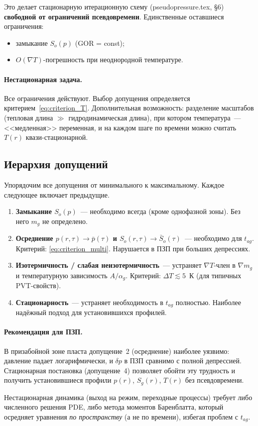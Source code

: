 \documentclass[12pt,a4paper]{article}
\begin{document}
Это делает стационарную итерационную схему
(pseudopressure.tex, \S6) \textbf{свободной от ограничений
псевдовремени}. Единственные оставшиеся ограничения:
\begin{itemize}[nosep]
  \item замыкание $S_o(p)$ (GOR = const);
  \item $O(\nabla T)$-погрешность при неоднородной температуре.
\end{itemize}

\paragraph{Нестационарная задача.}
Все ограничения действуют.
Выбор допущения определяется
критерием~\eqref{eq:criterion_T}.
Дополнительная возможность: разделение масштабов
(тепловая длина $\gg$ гидродинамическая длина),
при котором температура~--- <<медленная>> переменная,
и на каждом шаге по времени можно считать $T(r)$
квази-стационарной.

\subsection{Иерархия допущений}

Упорядочим все допущения от минимального к максимальному.
Каждое следующее включает предыдущие.

\begin{enumerate}
  \item \textbf{Замыкание $S_o(p)$}~--- необходимо всегда
        (кроме однофазной зоны). Без него $m_g$
        не определено.

  \item \textbf{Осреднение $p(r,\tau) \to \bar{p}(\tau)$
        и $S_o(r,\tau) \to \bar{S}_o(\tau)$}~---
        необходимо для $t_{ag}$.
        Критерий: \eqref{eq:criterion_multi}.
        Нарушается в ПЗП при больших депрессиях.

  \item \textbf{Изотермичность / слабая неизотермичность}~---
        устраняет $\nabla T$-член в $\nabla m_g$
        и температурную зависимость $A/\alpha_g$.
        Критерий: $\Delta T \lesssim 5$~К
        (для типичных PVT-свойств).

  \item \textbf{Стационарность}~--- устраняет необходимость
        в $t_{ag}$ полностью. Наиболее надёжный подход
        для установившихся профилей.
\end{enumerate}

\paragraph{Рекомендация для ПЗП.}
В призабойной зоне пласта допущение~2
(осреднение) наиболее уязвимо: давление
падает логарифмически, и $\delta p$ в ПЗП
сравнимо с полной депрессией. Стационарная
постановка (допущение~4) позволяет обойти
эту трудность и получить установившиеся
профили $p(r)$, $S_g(r)$, $T(r)$ без
псевдовремени.

Нестационарная динамика (выход на режим,
переходные процессы) требует либо численного
решения PDE, либо метода моментов Баренблатта,
который осредняет уравнения
\emph{по пространству} (а не по времени),
избегая проблем с $t_{ag}$.
\end{document}
